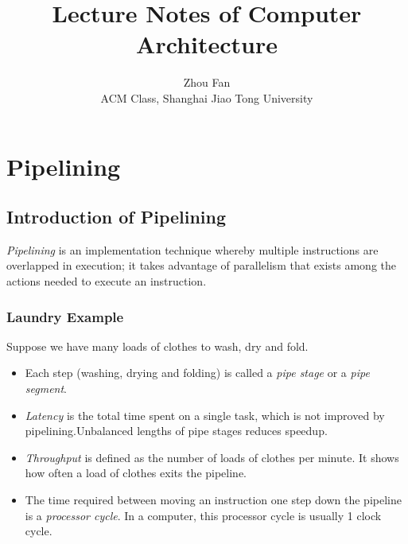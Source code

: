 \documentclass[12pt, a4paper]{article}
\title{Lecture Notes of Computer Architecture}
\author{Zhou Fan\\ACM Class, Shanghai Jiao Tong University}
\date{}
\theoremstyle{margin}
\begin{document}
\maketitle
\tableofcontents
\newpage

\section{Pipelining}

  \subsection{Introduction of Pipelining}

    \indent 

    \emph{Pipelining} is an implementation technique whereby multiple instructions are overlapped in execution; it takes advantage of parallelism that exists among the actions needed to execute an instruction.\cite{caqa}

    \subsubsection{Laundry Example}
      \indent 

      Suppose we have many loads of clothes to wash, dry and fold. 

      \begin{itemize}
        \item Each step (washing, drying and folding) is called a \emph{pipe stage} or a \emph{pipe segment}. 
        \item \emph{Latency} is the total time spent on a single task, which is not improved by pipelining.Unbalanced lengths of pipe stages reduces speedup. 
        \item \emph{Throughput} is defined as the number of loads of clothes per minute. It shows how often a load of clothes exits the pipeline.
        \item The time required between moving an instruction one step down the pipeline is a \emph{processor cycle}. In a computer, this processor cycle is usually 1 clock cycle.\cite{caqa}
      \end{itemize}
\end{document}
